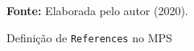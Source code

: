 \begin{figure}[ht!]
\centering

\caption{\textmd{Definição de \texttt{References} no \gls{MPS}}}
\label{fig:references}

\par\medskip\textbf{Fonte:} Elaborada pelo autor (2020). \par\medskip

\end{figure}

